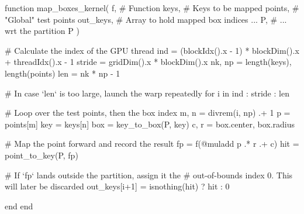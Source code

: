 \begin{jllisting}[language=julia, style=jlcodestyle, label=lst:gpu_kernel, caption=GPU kernel to calculate $f(\mathcal{B})$]
    function map_boxes_kernel(
            f,          # Function
            keys,       # Keys to be mapped
            points,     # "Global" test points
            out_keys,   # Array to hold mapped box indices ...
            P,          # ... wrt the partition P
        )

        # Calculate the index of the GPU thread
        ind = (blockIdx().x - 1) * blockDim().x + threadIdx().x - 1
        stride = gridDim().x * blockDim().x
        nk, np = length(keys), length(points)
        len = nk * np - 1

        # In case `len` is too large, launch the warp repeatedly
        for i in ind : stride : len
        
            # Loop over the test points, then the box index
            m, n = divrem(i, np) .+ 1
            p    = points[m]
            key  = keys[n]
            box  = key_to_box(P, key)
            c, r = box.center, box.radius

            # Map the point forward and record the result
            fp   = f(@muladd p .* r .+ c)
            hit  = point_to_key(P, fp)

            # If `fp` lands outside the partition, assign it the
            # out-of-bounds index 0. This will later be discarded
            out_keys[i+1] = isnothing(hit) ? hit : 0

        end
    end
\end{jllisting}

